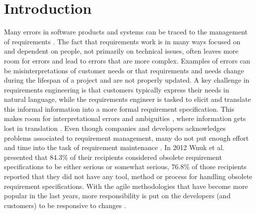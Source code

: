 \documentclass[conference]{IEEEtran}
\begin{document}
\section{Introduction}
Many errors in software products and systems can be traced to the management of requirements \cite{tseng1998, wiegers2009software}. 
The fact that requirements work is in many ways focused on and dependent on people, not primarily on technical issues, often leaves more room for errors and lead to errors that are more complex. 
Examples of errors can be misinterpretations of customer needs or that requirements and needs change during the lifespan of a project \cite{saiedian2000, bjarnason2011requirements} and are not properly updated. 
A key challenge in requirements engineering is that customers typically express their needs in natural language, while the requirements engineer is tasked to elicit and translate this informal information into a more formal requirement specification. 
This makes room for interpretational errors and ambiguities \cite{al1996,ross1977}, where information gets lost in translation \cite{bjarnason2011requirements}.  
Even though companies and developers acknowledges problems associated to requirement management, many do not put enough effort and time into the task of requirement maintenance \cite{forward2002}. In 2012 Wnuk et al. \cite{wnuk2012obsolete} presented that 84.3\% of their recipients considered obsolete requirement specifications to be either serious or somewhat serious, 76.8\% of those recipients reported that they did not have any tool, method or process for handling obsolete requirement specifications. With the agile methodologies that have become more popular in the last years, more responsibility is put on the developers (and customers) to be responsive to changes \cite{highsmith2001, ibrahim2012overview}. 
\end{document}
